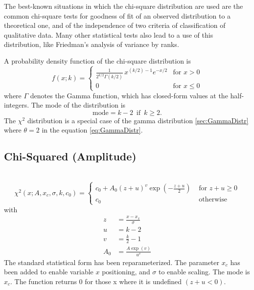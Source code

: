 The best-known situations in which the chi-square distribution are
used are the common chi-square tests for goodness of fit of an observed
distribution to a theoretical one, and of the independence of two criteria
of classification of qualitative data. Many other statistical tests also
lead to a use of this distribution, like Friedman's analysis of variance by ranks.


A probability density function of the chi-square distribution is
\begin{equation}
    f(x;k)= \begin{cases}\displaystyle \frac{1}{2^{k/2}\Gamma(k/2)}\,x^{(k/2) - 1} e^{-x/2}&\text{for }x>0\\
                            0&\text{for }x\le 0
            \end{cases}
\end{equation}
where $\Gamma$ denotes the Gamma function, which has closed-form values at the half-integers.
The mode of the distribution is
\begin{equation}
\mathrm{mode} = k-2\, \mbox{ if }\, k\geq 2.
\end{equation}
The $\chi^2$ distribution is a special case of the gamma distribution \ref{sec:GammaDistr}
where $\theta = 2$ in the equation \ref{eq:GammaDistr}.

\subsection{Chi-Squared (Amplitude)} \hspace{1pt} \\
\label{sec:ChiSquaredAmplitude}
\begin{equation}
\chi^2(x;A,x_c,\sigma,k,c_0) =
\begin{cases}
c_0+A_0 \left(z+u\right)^{v} \exp\left(-\frac{z+u}{2}\right) & \mbox{ for } z+u \geq 0 \\
c_0 & \mbox{ otherwise}
\end{cases}
\end{equation}
with
\begin{align}
z &= \frac{x-x_x}{\sigma} \\
u &= k-2 \\
v &= \frac{k}{2}-1 \\
A_0 &= \frac{A\exp(v)}{u^v}
\end{align}
The standard statistical form has been reparameterized. The parameter $x_c$ has been added
to enable variable $x$ positioning, and $\sigma$ to enable scaling. The mode is $x_c$.
The function returns 0 for those x where it is undefined $(z+u<0)$.

